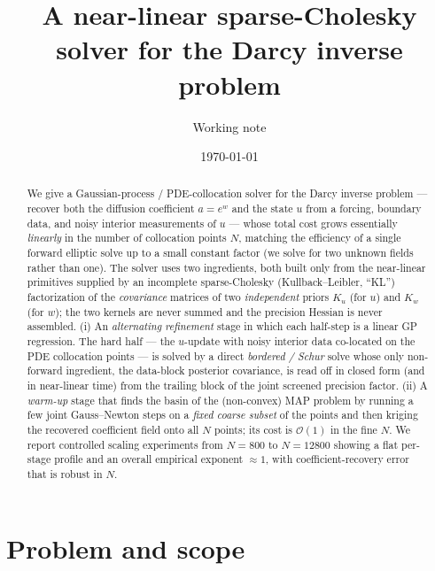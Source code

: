 \documentclass[11pt]{article}
\title{A near-linear sparse-Cholesky solver for the Darcy inverse problem}
\author{Working note}
\date{\today}
\newcommand{\bigO}{\mathcal{O}}
\begin{document}
\maketitle

\begin{abstract}
We give a Gaussian-process / PDE-collocation solver for the Darcy inverse
problem --- recover both the diffusion coefficient $a=e^{w}$ and the state $u$
from a forcing, boundary data, and noisy interior measurements of $u$ --- whose
total cost grows essentially \emph{linearly} in the number of collocation points
$N$, matching the efficiency of a single forward elliptic solve up to a small
constant factor (we solve for two unknown fields rather than one). The solver
uses two ingredients, both built only from the near-linear primitives supplied
by an incomplete sparse-Cholesky (Kullback--Leibler, ``KL'') factorization of
the \emph{covariance} matrices of two \emph{independent} priors $K_u$ (for $u$)
and $K_w$ (for $w$); the two kernels are never summed and the precision Hessian
is never assembled. (i) An \emph{alternating refinement} stage in which each
half-step is a linear GP regression. The hard half --- the $u$-update with noisy
interior data co-located on the PDE collocation points --- is solved by a direct
\emph{bordered / Schur} solve whose only non-forward ingredient, the data-block
posterior covariance, is read off in closed form (and in near-linear time) from
the trailing block of the joint screened precision factor. (ii) A
\emph{warm-up} stage that finds the basin of the (non-convex) MAP problem by
running a few joint Gauss--Newton steps on a \emph{fixed coarse subset} of the
points and then kriging the recovered coefficient field onto all $N$ points; its
cost is $\bigO(1)$ in the fine $N$. We report controlled scaling experiments
from $N=800$ to $N=12800$ showing a flat per-stage profile and an
overall empirical exponent $\approx 1$, with coefficient-recovery error that is
robust in $N$.
\end{abstract}

\tableofcontents

\section{Problem and scope}\label{sec:problem}
\end{document}
